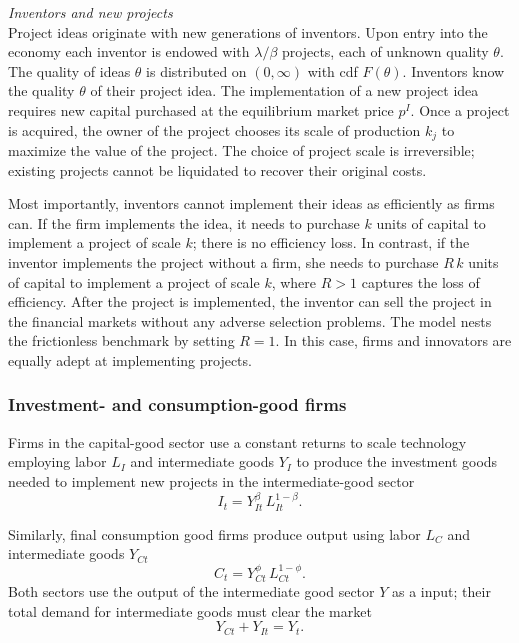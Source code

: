 \documentclass[12pt]{article}
\begin{document}
\vspace{0.5cm}
\noindent\emph{Inventors and new projects}\\
Project ideas originate with new generations of inventors. Upon entry into the economy each inventor is endowed with $\lambda/\beta$ projects, each of unknown quality $\theta$.  The quality of ideas $\theta$ is distributed on $(0,\infty)$ with cdf $F(\theta)$. Inventors know the quality $\theta$ of their project idea.  The implementation of a  new project idea requires new capital purchased at the equilibrium market price $p^I$.  Once a project is acquired, the owner of the project chooses its scale of production  $k_{j}$ to maximize the value of the project. The choice of project scale is irreversible; existing projects cannot be liquidated to recover their original costs.

Most importantly, inventors cannot implement their ideas as efficiently as firms can. If the firm implements the idea, it needs to purchase $k$ units of capital to implement a project of scale $k$; there is no efficiency loss. In contrast, if the inventor implements the project without a firm, she needs to purchase $R\,k$ units of capital to implement a project of scale $k$, where $R>1$ captures the loss of efficiency. After the project is implemented, the inventor can sell the project in the financial markets without any adverse selection problems. The model nests the frictionless benchmark by setting $R=1$. In this case, firms and innovators are equally adept at implementing projects.



\subsubsection{Investment- and consumption-good firms}

Firms in the capital-good sector use a constant returns to scale technology employing labor $L_I$ and intermediate goods $Y_I$ to produce the investment goods needed to implement new projects in the intermediate-good sector
\begin{equation}\label{eqn:Ioutput}
I_t =  Y_{It}^\beta \, L^{1-\beta}_{I t}.
\end{equation}

Similarly, final consumption good  firms produce output using labor  $L_C$ and intermediate goods  ${Y}_{Ct}$
\begin{equation}\label{eqn:Coutput}
C_t =   {Y}_{Ct}^\phi \, L_{C t}^{1-\phi}.
\end{equation}
Both sectors use the output of the intermediate good sector $Y$ as a input; their total demand for intermediate goods must clear the market
\begin{equation}
Y_{Ct} + Y_{It} = Y_t.
\end{equation}
\end{document}
